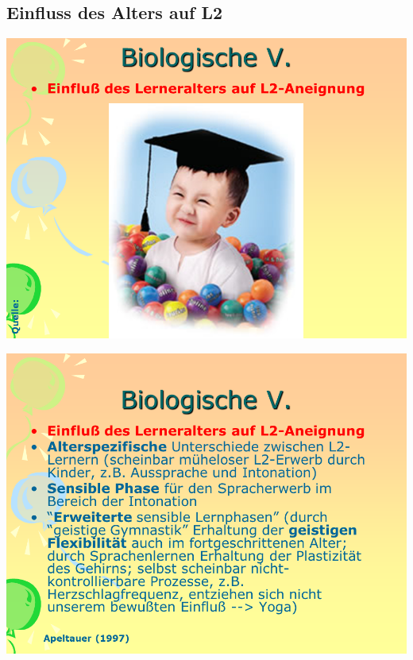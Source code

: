 \documentclass[
  letterpaper,
]{scrbook}
\begin{document}
\hypertarget{einfluss-des-alters-auf-l2}{%
\subsection{Einfluss des Alters auf
L2}\label{einfluss-des-alters-auf-l2}}

\includegraphics[width=1\textwidth,height=\textheight]{./pictures/neuro/Diapozitiv76.PNG}

\includegraphics[width=1\textwidth,height=\textheight]{./pictures/neuro/Diapozitiv77.PNG}
\end{document}
